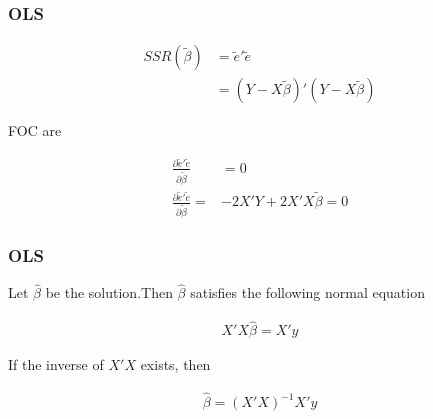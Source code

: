 \documentclass[
  shownotes,
  xcolor={svgnames},
  hyperref={colorlinks,citecolor=DarkBlue,linkcolor=DarkRed,urlcolor=DarkBlue}
  ]{beamer}
\begin{document}

\begin{frame}
\frametitle{OLS}

\begin{align}
  SSR(\tilde \beta) &= \tilde e' \tilde e  \\
  &= (Y-X \tilde \beta)'(Y-X \tilde \beta)
\end{align}

FOC are

\begin{align}
 \frac{\partial \tilde{e}' \tilde{e}}{\partial \tilde \beta} &=0   \\
 \frac{\partial \tilde{e}' \tilde{e}}{\partial \tilde \beta}  =&-2X'Y + 2X'X \tilde\beta =0
\end{align}

\end{frame}


\begin{frame}
\frametitle{OLS}

Let $\hat \beta$ be the solution.Then $\hat \beta$ satisfies the following normal equation

\begin{align}
X'X\hat \beta=X'y
\end{align}

If the inverse of $X'X$ exists, then

\begin{align}
\hat \beta=(X'X)^{-1}X'y
\end{align}


\end{frame}


\end{document}
